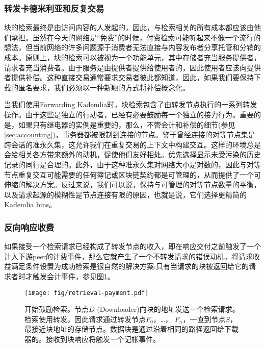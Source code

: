 \green{}

\subsubsection{转发卡德米利亚和反复交易}

块的检索最终是由访问内容的人发起的，因此，与检索相关的所有成本都应该由他们承担。虽然在今天的网络是“免费”的时候，付费检索可能听起来不像一个流行的想法，但当前网络的许多问题源于消费者无法直接与内容发布者分享托管和分销的成本。原则上，块的检索可以被视为一个功能单元，其中存储者充当服务提供者，请求者充当消费者。由于服务是由提供者提供给使用者的，因此使用者应该向提供者提供补偿。这种直接交易通常要求交易者彼此都知道，因此，如果我们要保持下载的匿名要求，我们必须以一种新颖的方式将补偿概念化。

当我们使用Forwarding Kademlia时，块检索包含了由转发节点执行的一系列转发操作。由于这些是独立的行动者，已经有必要鼓励每一个独立的接力行为。重要的是，如果只有继电器的实例是重要的，那么，不管会计和补偿的细节(参见\ref{sec:accounting})，事务器都被限制到连接的节点。鉴于曾经连接的对等节点集是跨会话的准永久集，这允许我们在重复交易的上下文中构建交互。这样的环境总是会给相关各方带来额外的动机，促使他们友好相处。优先选择显示未受污染的历史记录的同行是合理的。此外，由于这种准永久集对网络大小是对数的，因此与对等节点重复交互可能需要的任何簿记或区块链契约都是可管理的，从而提供了一个可伸缩的解决方案。反过来说，我们可以说，保持与可管理的对等节点数量的平衡，以及请求起源的模糊性是节点连接有限的原因，也就是说，它们选择更精简的Kademlia bins。

\subsubsection{反向响应收费}

如果接受一个检索请求已经构成了转发节点的收入，即在响应交付之前触发了一个计入下游peer的计费事件，那么它就产生了一个不转发请求的错误动机。将请求收益满足条件设置为成功检索是很自然的解决方案:只有当请求的块被返回给它的请求者时才触发会计事件，参见图\ref{fig:retrieval-payment}。


\begin{figure}[htbp]
   \centering
   \texttt{[image: fig/retrieval-payment.pdf]}
   \caption[开始鼓励检索\statusgreen]{开始鼓励检索。节点$D$ (Downloader)向块的地址发送一个检索请求。检索使用转发，因此请求通过转发节点$F_0$，…， $F_n$，一直到节点$S$，最接近块地址的存储节点。数据块是通过沿着相同的路径返回给下载器的。接收到块响应将触发一个记帐事件。}
   \label{fig:retrieval-payment}
\end{figure}

